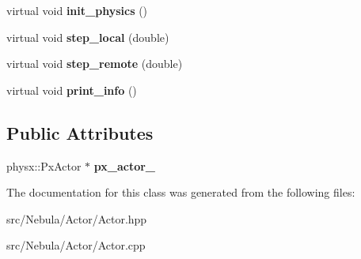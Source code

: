 \begin{DoxyCompactItemize}
\item 
\hypertarget{classNeb_1_1Actor_1_1Actor_af6dcb0fdb8d122abe63719ea6ecddf9f}{virtual void {\bfseries init\-\_\-physics} ()}\label{classNeb_1_1Actor_1_1Actor_af6dcb0fdb8d122abe63719ea6ecddf9f}

\item 
\hypertarget{classNeb_1_1Actor_1_1Actor_a12d8b4f75737f0e4b98ce8e67cb509da}{virtual void {\bfseries step\-\_\-local} (double)}\label{classNeb_1_1Actor_1_1Actor_a12d8b4f75737f0e4b98ce8e67cb509da}

\item 
\hypertarget{classNeb_1_1Actor_1_1Actor_a848163bd88f8885d71266a06cc316e88}{virtual void {\bfseries step\-\_\-remote} (double)}\label{classNeb_1_1Actor_1_1Actor_a848163bd88f8885d71266a06cc316e88}

\item 
\hypertarget{classNeb_1_1Actor_1_1Actor_a15c893673ddf3b5370abb04866da5779}{virtual void {\bfseries print\-\_\-info} ()}\label{classNeb_1_1Actor_1_1Actor_a15c893673ddf3b5370abb04866da5779}

\end{DoxyCompactItemize}
\subsection*{\-Public \-Attributes}
\begin{DoxyCompactItemize}
\item 
\hypertarget{classNeb_1_1Actor_1_1Actor_a09abac9a2f82780989321094de6d7bc3}{physx\-::\-Px\-Actor $\ast$ {\bfseries px\-\_\-actor\-\_\-}}\label{classNeb_1_1Actor_1_1Actor_a09abac9a2f82780989321094de6d7bc3}

\end{DoxyCompactItemize}


\-The documentation for this class was generated from the following files\-:\begin{DoxyCompactItemize}
\item 
src/\-Nebula/\-Actor/\-Actor.\-hpp\item 
src/\-Nebula/\-Actor/\-Actor.\-cpp\end{DoxyCompactItemize}
